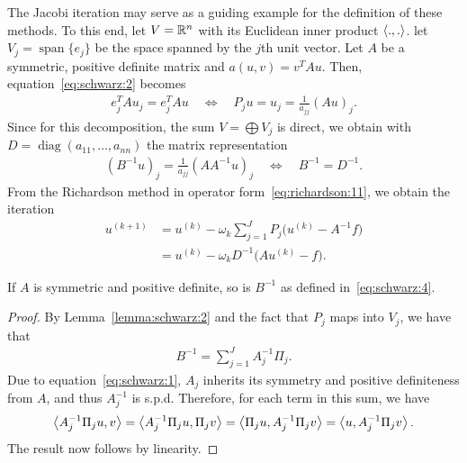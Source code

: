 \begin{example}
  The Jacobi iteration may serve as a guiding example for the
  definition of these methods. To this end, let $V = \mathbb R^n$ with its
  Euclidean inner product $\scal(.,.)$. let $V_j =
  \operatorname{span}\{e_j\}$ be the space spanned by the $j$th unit
  vector. Let $A$ be a symmetric, positive definite matrix and $a(u,v)
  = v^T A u$. Then, equation~\eqref{eq:schwarz:2} becomes
  \begin{gather*}
    e_j^T A u_j = e_j^T A u
    \quad \Leftrightarrow \quad
    P_j u = u_j = \frac1{a_{j j}}(A u)_j.
  \end{gather*}
  Since for this decomposition, the sum $V=\bigoplus V_j$ is direct,
  we obtain with $D=\operatorname{diag}(a_{11},\dots,a_{n n})$ the
  matrix representation
  \begin{gather*}
    (B^{-1} u)_j = \frac1{a_{j j}}(A A^{-1} u)_j
    \quad \Leftrightarrow \quad
    B^{-1} = D^{-1}.
  \end{gather*}
  From the Richardson method in operator
  form~\eqref{eq:richardson:11}, we obtain the iteration
  \begin{align*}
    u^{(k+1)} &= u^{(k)} - \omega_k \sum_{j=1}^J P_j \bigl(u^{(k)} -
    A^{-1}f\bigr)\\
    &= u^{(k)} - \omega_k D^{-1} \bigl(A u^{(k)} - f\bigr).
  \end{align*}
\end{example}

\begin{lemma}
  \label{lemma:schwarz:3}
  If $A$ is symmetric and positive definite, so is $B^{-1}$ as defined
  in~\eqref{eq:schwarz:4}.
\end{lemma}

\begin{proof}
  By Lemma~\ref{lemma:schwarz:2} and the fact that $P_j$ maps into $V_j$, we have that
  \begin{gather}
    \label{eq:schwarz:16}
    B^{-1} = \sum_{j=1}^J A_j^{-1} \Pi_j.
  \end{gather}
  Due to equation~\eqref{eq:schwarz:1}, $A_j$ inherits its symmetry
  and positive definiteness from $A$, and thus $A_j^{-1}$ is s.p.d.
  Therefore, for each term in this sum, we have
  \begin{gather*}
    \scal(A_j^{-1} \Pi_j u, v)
    = \scal(A_j^{-1} \Pi_j u, \Pi_j v)
    = \scal( \Pi_j u, A_j^{-1}\Pi_j v)
    = \scal(u, A_j^{-1}\Pi_j v).
  \end{gather*}
  The result now follows by linearity.
\end{proof}

